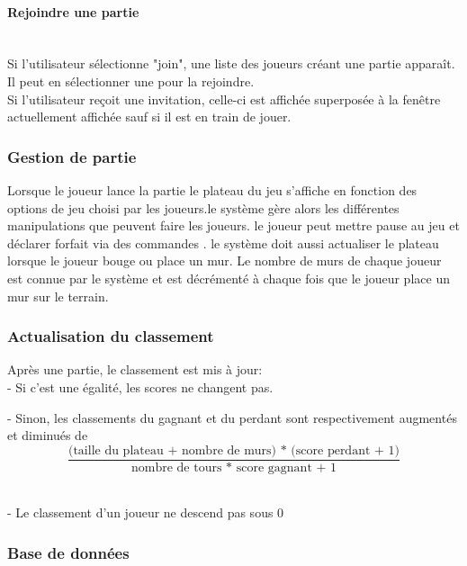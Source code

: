 \documentclass[french, utf8]{article}
\begin{document}
\paragraph{Rejoindre une partie}
\\Si l’utilisateur sélectionne
"join", une liste des joueurs créant une partie apparaît.
\\Il peut en sélectionner une pour la rejoindre.
\\Si l’utilisateur reçoit une invitation, celle-ci est affichée superposée à la fenêtre actuellement affichée sauf si il est en train de jouer.

\subsubsection{Gestion de partie}
\label{sec:GestionDePartie}
Lorsque le joueur lance la partie le plateau du jeu s'affiche en fonction des options de jeu choisi par les joueurs.le système gère alors les différentes manipulations que peuvent faire les joueurs. le joueur peut mettre pause au jeu et déclarer forfait via des commandes  . le système doit aussi actualiser le plateau lorsque le joueur bouge ou place un mur. Le nombre de murs de chaque joueur est connue par le système et est décrémenté à chaque fois que le joueur place un mur sur le terrain.


\subsubsection{Actualisation du classement}
\label{sec:ActualisationDuClassement}

Après une partie, le classement est mis à jour:
\\- Si c'est une égalité, les scores ne changent pas.

- Sinon,
les classements du gagnant et du perdant sont respectivement augmentés et diminués de \\

\[
 \frac{\text{(taille du plateau + nombre de murs) * (score perdant + 1)}}{\text{nombre de tours * score gagnant + 1}}
\]

\\- Le classement d'un joueur ne descend pas sous 0



\subsubsection{Base de données}
\label{sec:BaseDeDonnées}
\end{document}

